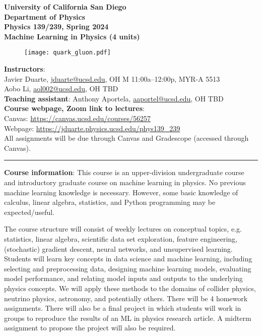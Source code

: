 \documentclass[12pt]{article}
\begin{document}
\begin{center}
	\textbf{University of California San Diego\\
		Department of Physics\\
		Physics 139/239, Spring 2024\\
		Machine Learning in Physics (4 units)}
\end{center}

\begin{figure}[h!]
	\centering
	\texttt{[image: quark\_gluon.pdf]}
\end{figure}

\noindent\textbf{Instructors}:\\
Javier Duarte, \href{mailto:jduarte@ucsd.edu}{jduarte@ucsd.edu}, OH M 11:00a--12:00p, MYR-A 5513\\
Aobo Li, \href{mailto:aol002@ucsd.edu}{aol002@ucsd.edu}, OH TBD\\
\noindent \textbf{Teaching assistant}: Anthony Aportela, \href{mailto:aaportel@ucsd.edu}{aaportel@ucsd.edu}, OH TBD\\

\noindent\textbf{Course webpage, Zoom link to lectures}:\\
\hspace*{1cm}Canvas: \href{https://canvas.ucsd.edu/courses/56257}{https://canvas.ucsd.edu/courses/56257}\\
\hspace*{1cm}Webpage: \href{https://jduarte.physics.ucsd.edu/phys139\_239}{https://jduarte.physics.ucsd.edu/phys139\_239}\\
\hspace*{1cm}All assignments will be due through Canvas and Gradescope (accessed through Canvas).\\

\begin{center}
	\rule{\textwidth}{0.5pt}
\end{center}

\noindent\textbf{Course information}: This course is an upper-division undergraduate course and introductory graduate course on machine learning in physics.
No previous machine learning knowledge is necessary.
However, some basic knowledge of calculus, linear algebra, statistics, and Python programming may be expected/useful.

The course structure will consist of weekly lectures on conceptual topics, e.g. statistics, linear algebra, scientific data set exploration, feature engineering, (stochastic) gradient descent, neural networks, and unsupervised learning.
Students will learn key concepts in data science and machine learning, including selecting and preprocessing data, designing machine learning models, evaluating model performance, and relating model inputs and outputs to the underlying physics concepts.
We will apply these methods to the domains of collider physics, neutrino physics, astronomy, and potentially others.
There will be 4 homework assignments.
There will also be a final project in which students will work in groups to reproduce the results of an ML in physics research article.
A midterm assignment to propose the project will also be required.
\end{document}
